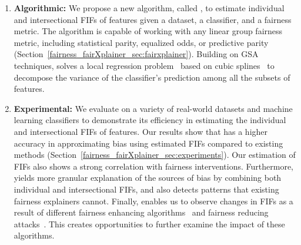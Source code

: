 \begin{enumerate}
	\item \textbf{Algorithmic:} We propose a new algorithm, called {\fairXplainer}, to estimate individual and intersectional FIFs of features given a dataset, a classifier, and a fairness metric. The algorithm is capable of working with any linear group fairness metric, including statistical parity, equalized odds, or predictive parity (Section~\ref{fairness_fairXplainer_sec:fairxplainer}). Building on GSA\cite{saltelli2008global} techniques, {\fairXplainer} solves a local regression problem~\cite{loader2006local} based on cubic splines~\cite{li2010global} to decompose the variance of the classifier's prediction among all the subsets of features.
	
	
	\item \textbf{Experimental:} We evaluate  {\fairXplainer}  on a variety of real-world datasets and machine learning classifiers to demonstrate its efficiency in estimating the individual and intersectional FIFs of features. Our results show that {\fairXplainer} has a higher accuracy in approximating bias using estimated FIFs compared to existing methods (Section~\ref{fairness_fairXplainer_sec:experiments}). Our estimation of FIFs also shows a strong correlation with fairness interventions. Furthermore, {\fairXplainer} yields more granular explanation of the sources of bias by combining both individual and intersectional FIFs, and also detects patterns that existing fairness explainers cannot. Finally, {\fairXplainer} enables us to observe changes in FIFs as a result of different fairness enhancing algorithms~\cite{calmon2017optimized,hardt2016equality,kamiran2012decision,zemel2013learning,zhang2018mitigating,zhang2018fairness,zhang2019faht} and fairness reducing attacks~\cite{hua2021human,mehrabi2020exacerbating,solans2020poisoning}. This creates opportunities to further examine the impact of these algorithms.	
\end{enumerate}




